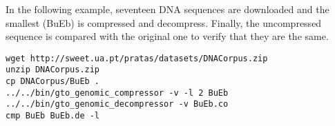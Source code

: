 In the following example, seventeen DNA sequences are downloaded and the smallest (BuEb) is compressed and decompress. Finally, the uncompressed sequence is compared with the original one to verify that they are the same.
\begin{lstlisting}
wget http://sweet.ua.pt/pratas/datasets/DNACorpus.zip
unzip DNACorpus.zip
cp DNACorpus/BuEb .
../../bin/gto_genomic_compressor -v -l 2 BuEb
../../bin/gto_genomic_decompressor -v BuEb.co 
cmp BuEb BuEb.de -l
\end{lstlisting}